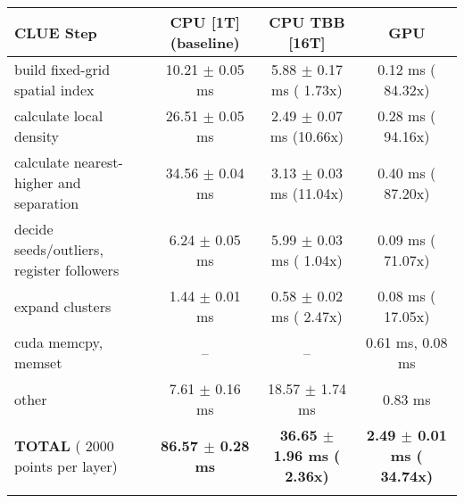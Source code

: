     \begin{tabular}{l|c|c|c}
    \hline
    CLUE Step                                 & CPU [1T] (baseline)         & CPU TBB [16T]                         & GPU                       \\ \hline
    build fixed-grid spatial index            &  10.21 $\pm$  0.05 ms       &   5.88 $\pm$  0.17 ms ( 1.73x)        &   0.12 ms ( 84.32x)       \\
    calculate local density                   &  26.51 $\pm$  0.05 ms       &   2.49 $\pm$  0.07 ms (10.66x)        &   0.28 ms ( 94.16x)       \\
    calculate nearest-higher and separation   &  34.56 $\pm$  0.04 ms       &   3.13 $\pm$  0.03 ms (11.04x)        &   0.40 ms ( 87.20x)       \\
    decide seeds/outliers, register followers &   6.24 $\pm$  0.05 ms       &   5.99 $\pm$  0.03 ms ( 1.04x)        &   0.09 ms ( 71.07x)       \\
    expand clusters                           &   1.44 $\pm$  0.01 ms       &   0.58 $\pm$  0.02 ms ( 2.47x)        &   0.08 ms ( 17.05x)       \\ \hline
    cuda memcpy, memset                       & --                          & --                                    &   0.61 ms,   0.08 ms      \\ 
    other                                     &   7.61 $\pm$  0.16 ms       &  18.57 $\pm$  1.74 ms                 &   0.83 ms                 \\ \hline
    \textbf{TOTAL} ( 2000 points per layer)   & \textbf{ 86.57 $\pm$  0.28 ms} & \textbf{ 36.65 $\pm$  1.96 ms ( 2.36x)} & \textbf{  2.49 $\pm$  0.01 ms ( 34.74x)}  \\
    \hline
    \multicolumn{4}{c}{} 
    \end{tabular}
    \linebreak


